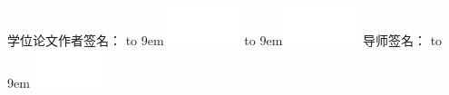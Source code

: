 {{  学位论文作者签名：
  \ifpdf
  {\hbox to 9em{\includegraphics[width=6em,height=3em]{./Signature/sign_cr_2.pdf}}}
  \else
  {\hbox to 9em{\includegraphics[width=6em,height=3em]{./Signature/sign_cr_2.eps}}}
  \fi
  导师签名：
  \ifpdf
  {\hbox to 9em{\includegraphics[width=6em,height=3em]{./Signature/sign_cr_s.pdf}}}
  \else
  {}
  \fi

  \vspace{1ex}

  \PutsigndateB
  \hspace{2.75em}
  \PutsigndateC}
  }
